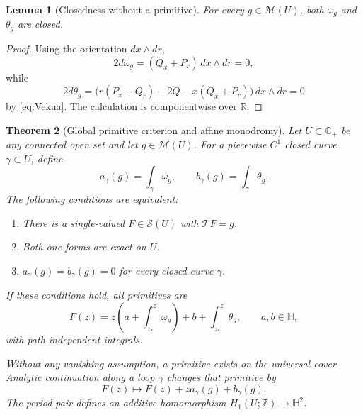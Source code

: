 \documentclass[11pt,a4paper]{article}
\numberwithin{equation}{section}
\newtheorem{theorem}{Theorem}[section]
\newtheorem{lemma}[theorem]{Lemma}
\theoremstyle{definition}
\theoremstyle{remark}
\newcommand{\R}{\mathbb R}
\newcommand{\C}{\mathbb C}
\newcommand{\HH}{\mathbb H}
\newcommand{\Cp}{\C_+}
\newcommand{\cS}{\mathscr S}
\newcommand{\cM}{\mathscr M}
\newcommand{\T}{\mathcal T}
\begin{document}
\begin{lemma}[Closedness without a primitive]
\label{lem:closed}
For every $g\in\cM(U)$, both $\omega_g$ and $\theta_g$ are closed.
\end{lemma}
\begin{proof}
Using the orientation $dx\wedge dr$,
\[
 2d\omega_g=(Q_x+P_r)\,dx\wedge dr=0,
\]
while
\[
 2d\theta_g=
 \bigl(r(P_x-Q_r)-2Q-x(Q_x+P_r)\bigr)\,dx\wedge dr=0
\]
by \eqref{eq:Vekua}. The calculation is componentwise over $\R$.
\end{proof}

\begin{theorem}[Global primitive criterion and affine monodromy]
\label{thm:period}
Let $U\subset\Cp$ be any connected open set and let $g\in\cM(U)$.
For a piecewise $C^1$ closed curve $\gamma\subset U$, define
\begin{equation}
 a_\gamma(g)=\int_\gamma\omega_g,\qquad
 b_\gamma(g)=\int_\gamma\theta_g.
 \label{eq:periods}
\end{equation}
The following conditions are equivalent:
\begin{enumerate}[label=\textup{(\roman*)}]
\item There is a single-valued $F\in\cS(U)$ with $\T F=g$.
\item Both one-forms are exact on $U$.
\item $a_\gamma(g)=b_\gamma(g)=0$ for every closed curve $\gamma$.
\end{enumerate}
If these conditions hold, all primitives are
\begin{equation}
 F(z)=z\left(a+\int_{z_*}^{z}\omega_g\right)
       +b+\int_{z_*}^{z}\theta_g,
 \qquad a,b\in\HH,
 \label{eq:globalinverse}
\end{equation}
with path-independent integrals.

Without any vanishing assumption, a primitive exists on the universal cover.
Analytic continuation along a loop $\gamma$ changes that primitive by
\begin{equation}
 F(z)\longmapsto F(z)+z a_\gamma(g)+b_\gamma(g).
 \label{eq:monodromy}
\end{equation}
The period pair defines an additive homomorphism
$H_1(U;\mathbb Z)\to\HH^2$.
\end{theorem}
\end{document}
